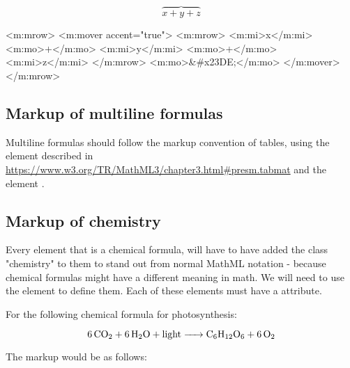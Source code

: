 \documentclass[english,a4paper,11pt]{article}
\begin{document}
\begin{eksempler}
\begin{eksempler}
	\begin{equation}
		\overbrace{x+y+z}
	\end{equation}

	\begin{kodeblokk}
	\begin{verbatimtab}[3]
		<m:mrow>
			<m:mover accent="true">
				<m:mrow>
					<m:mi>x</m:mi>
					<m:mo>+</m:mo>
					<m:mi>y</m:mi>
					<m:mo>+</m:mo>
					<m:mi>z</m:mi>
				</m:mrow>
				<m:mo>&#x23DE;</m:mo>
			</m:mover>
	  	</m:mrow>
	\end{verbatimtab}
	\end{kodeblokk}
\end{eksempler}

\subsection{Markup of multiline formulas}

Multiline formulas should follow the markup convention of tables, using the  element described in \url{https://www.w3.org/TR/MathML3/chapter3.html#presm.tabmat} and the element .

\subsection{Markup of chemistry}

Every  element that is a chemical formula, will have to have added the class "chemistry" to them to stand out from normal MathML notation - because chemical formulas might have a different meaning in math. We will need to use the  element to define them. Each of these  elements must have a  attribute.

For the following chemical formula for photosynthesis:

\begin{eksempler}
\begin{equation}
    \ce{6 CO_2 + 6 H_2O + light -> C_6H_12O_6 + 6 O_2}
\end{equation}

The markup would be as follows:
\begin{kodeblokk}
\end{kodeblokk}
\end{eksempler}


\end{eksempler}
\end{document}
